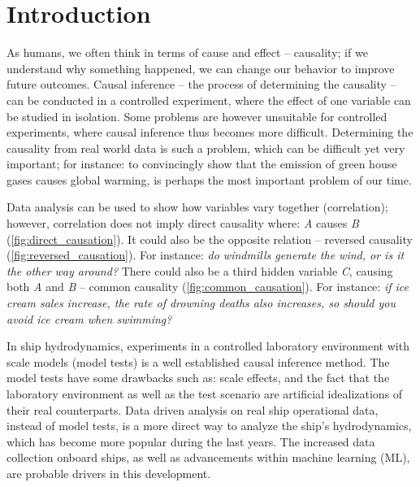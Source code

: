 \section{Introduction}

As humans, we often think in terms of cause and effect -- causality; if we understand why something happened, we can change our behavior to improve future outcomes.
Causal inference -- the process of determining the causality -- can be conducted in a controlled experiment, where the effect of one variable can be studied in isolation.
Some problems are however unsuitable for controlled experiments, where causal inference thus becomes more difficult. Determining the causality from real world data is such a problem, which can be difficult yet very important; for instance: to convincingly show that the emission of green house gases causes global warming, is perhaps the most important problem of our time.

Data analysis can be used to show how variables vary together (correlation); however, correlation does not imply direct causality where: \emph{A} causes \emph{B} (\autoref{fig:direct_causation}). It could also be the opposite relation -- reversed causality (\autoref{fig:reversed_causation}).
For instance: \emph{do windmills generate the wind, or is it the other way around?} There could also be a third hidden variable \emph{C}, causing both \emph{A} and \emph{B} -- common causality (\autoref{fig:common_causation}). For instance: \emph{if ice cream sales increase, the rate of drowning deaths also increases, so should you avoid ice cream when swimming?}


In ship hydrodynamics, experiments in a controlled laboratory environment with scale models (model tests) is a well established causal inference method.
The model tests have some drawbacks such as: scale effects, and the fact that the laboratory environment as well as the test scenario are artificial idealizations of their real counterparts.
Data driven analysis on real ship operational data, instead of model tests, is a more direct way to analyze the ship's hydrodynamics, which has become more popular during the last years. The increased data collection onboard ships, as well as advancements within machine learning (ML), are probable drivers in this development.

